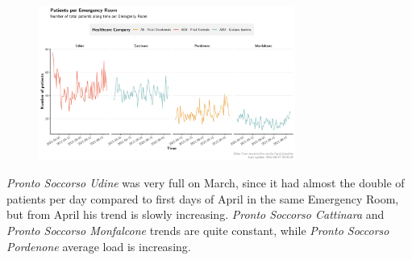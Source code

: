 \documentclass[8pt,english,aspectratio=169]{beamer}
\begin{document}
\begin{frame}
\begin{figure}
  \centering
  \includegraphics[width=0.75\textwidth]{../images/03_loads_trendlines-divided.jpg}
\end{figure}
\textit{Pronto Soccorso Udine} was very full on March, since it had almost the double of patients per day compared to first days of April in the same Emergency Room, but from April his trend is slowly increasing. \textit{Pronto Soccorso Cattinara} and \textit{Pronto Soccorso Monfalcone} trends are quite constant, while \textit{Pronto Soccorso Pordenone} average load is increasing.

\end{frame}
\end{document}
